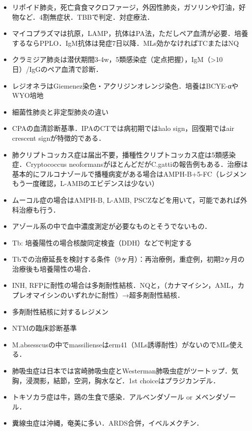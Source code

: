 \begin{itemize}

\item リポイド肺炎，死亡貪食マクロファージ，外因性肺炎，ガソリンや灯油，好物など．4割無症状．TBBで判定．対症療法．
\item マイコプラズマは抗原，LAMP，抗体はPA法，ただしペア血清が必要．培養するならPPLO．IgM抗体は発症7日以降．MLs効かなければTCまたはNQ
\item クラミジア肺炎は潜伏期間3-4w，5類感染症（定点把握），IgM（>10日）/IgGのペア血清で診断．
\item レジオネラはGiemenez染色・アクリジンオレンジ染色．培養はBCYE-αやWYO培地

\item 細菌性肺炎と非定型肺炎の違い
\item CPAの血清診断基準．IPAのCTでは病初期ではhalo sign，回復期ではair crescent signが特徴的である．
\item 肺クリプトコッカス症は届出不要，播種性クリプトコッカス症は5類感染症．Cryptococcus neoformansがほとんどだがC.gattiの報告例もある．治療は基本的にフルコナゾールで播種病変がある場合はAMPH-B+5-FC（レジメンもう一度確認，L-AMBのエビデンスは少ない）
\item ムーコル症の場合はAMPH-B, L-AMB, PSCZなどを用いて，可能であれば外科治療も行う．
\item アゾール系の中で血中濃度測定が必要なものとそうでないもの．

\item Tb: 培養陽性の場合核酸同定検査（DDH）などで判定する
\item Tbでの治療延長を検討する条件（9ヶ月）：再治療例，重症例，初期2ヶ月の治療後も培養陽性の場合．
\item INH, RFPに耐性の場合は多剤耐性結核．NQと，（カナマイシン，AML，カプレオマイシンのいずれかに耐性）→超多剤耐性結核．
\item 多剤耐性結核に対するレジメン
\item NTMの臨床診断基準
\item M.absesscusの中でmassilienseはerm41（MLs誘導耐性）がないのでMLs使える．

\item 肺吸虫症は日本では宮崎肺吸虫症とWesterman肺吸虫症がツートップ．気胸，浸潤影，結節，空洞，胸水など．1st choiceはプラジカンデル．
\item トキソカラ症は牛，鶏の生食で感染．アルベンダゾール or メベンダゾール．
\item 糞線虫症は沖縄，奄美に多い．ARDS合併，イベルメクチン．


\end{itemize}
